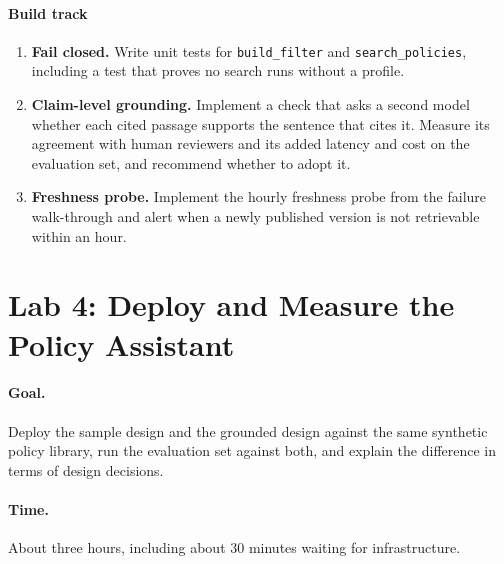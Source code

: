 \paragraph{Build track}
\begin{enumerate}[resume, itemsep=2pt]
  \item \textbf{Fail closed.} Write unit tests for \texttt{build\_filter} and \texttt{search\_policies}, including a test that proves no search runs without a profile.
  \item \textbf{Claim-level grounding.} Implement a check that asks a second model whether each cited passage supports the sentence that cites it. Measure its agreement with human reviewers and its added latency and cost on the evaluation set, and recommend whether to adopt it.
  \item \textbf{Freshness probe.} Implement the hourly freshness probe from the failure walk-through and alert when a newly published version is not retrievable within an hour.
\end{enumerate}

\section*{Lab 4: Deploy and Measure the Policy Assistant}

\paragraph{Goal.} Deploy the sample design and the grounded design against the same synthetic policy library, run the evaluation set against both, and explain the difference in terms of design decisions.

\paragraph{Time.} About three hours, including about 30 minutes waiting for infrastructure.

